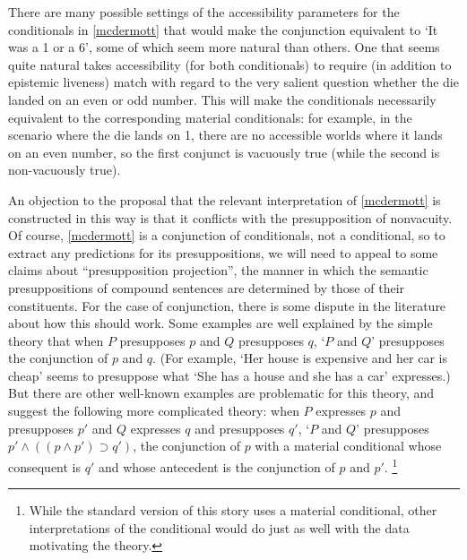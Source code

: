 \documentclass[If.tex]{subfiles}
\begin{document}
There are many possible settings of the accessibility parameters for the conditionals in \ref{mcdermott} that would make the conjunction equivalent to ‘It was a 1 or a 6’, some of which seem more natural than others.  One that seems quite natural takes accessibility (for both conditionals) to require (in addition to epistemic liveness) match with regard to the very salient question whether the die landed on an even or odd number.  This will make the conditionals necessarily equivalent to the corresponding material conditionals: for example, in the scenario where the die lands on 1, there are no accessible worlds where it lands on an even number, so the first conjunct is vacuously true (while the second is non-vacuously true).  

An objection to the proposal that the relevant interpretation of \ref{mcdermott} is constructed in this way is that it conflicts with the presupposition of nonvacuity.  Of course, \ref{mcdermott} is a conjunction of conditionals, not a conditional, so to extract any predictions for its presuppositions, we will need to appeal to some claims about “presupposition projection”, the manner in which the semantic presuppositions of compound sentences are determined by those of their constituents.  For the case of conjunction, there is some dispute in the literature about how this should work.  Some examples are well explained by the simple theory that when $P$ presupposes $p$ and $Q$ presupposes $q$, ‘$P$ and $Q$’ presupposes the conjunction of $p$ and $q$.  (For example, ‘Her house is expensive and her car is cheap’ seems to presuppose what ‘She has a house and she has a car’ expresses.)  But there are other well-known examples are problematic for this theory, and suggest the following more complicated theory: when $P$ expresses $p$ and presupposes $p'$ and $Q$ expresses $q$ and presupposes $q'$, ‘$P$ and $Q$’ presupposes $p'∧((p∧p')⊃q')$, the conjunction of $p$ with a material conditional whose consequent is $q'$ and whose antecedent is the conjunction of $p$ and $p'$.%
\footnote{While the standard version of this story uses a material conditional, other interpretations of the conditional would do just as well with the data motivating the theory.}  
\end{document}
